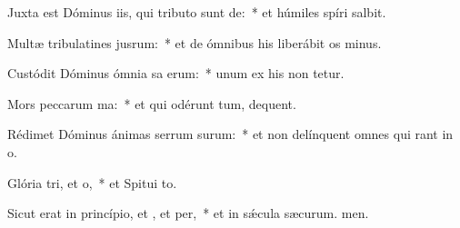 \item Juxta est Dóminus iis, qui tributo sunt de:~* et húmiles spíri salbit.
\item Multæ tribulatines jusrum:~* et de ómnibus his liberábit os minus.
\item Custódit Dóminus ómnia sa erum:~* unum ex his non tetur.
\item Mors peccarum ma:~* et qui odérunt tum, dequent.
\item Rédimet Dóminus ánimas serrum surum:~* et non delínquent omnes qui rant in o.
\item Glória tri, et o,~* et Spitui to.
\item Sicut erat in princípio, et , et per,~* et in sǽcula sæcurum. men.
